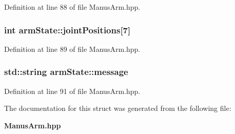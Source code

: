 \-Definition at line 88 of file \-Manus\-Arm.\-hpp.

\subsubsection[{joint\-Positions}]{\setlength{\rightskip}{0pt plus 5cm}int {\bf arm\-State\-::joint\-Positions}[7]}\label{structarmState_a7e9e18c429323ecabf773a070c6d4eba}


\-Definition at line 89 of file \-Manus\-Arm.\-hpp.

\subsubsection[{message}]{\setlength{\rightskip}{0pt plus 5cm}std\-::string {\bf arm\-State\-::message}}\label{structarmState_a217a56d5c4b7101f25667601ce1b1dd7}


\-Definition at line 91 of file \-Manus\-Arm.\-hpp.



\-The documentation for this struct was generated from the following file\-:\begin{DoxyCompactItemize}
\item 
{\bf \-Manus\-Arm.\-hpp}\end{DoxyCompactItemize}

